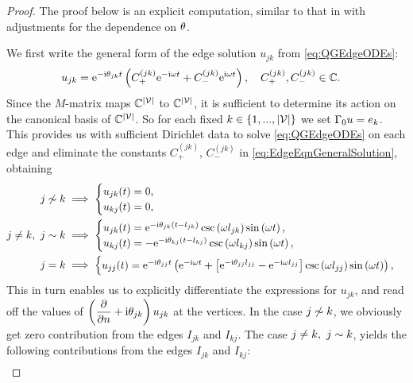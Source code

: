 \begin{proof}
	The proof below is an explicit computation, similar to that in \cite{ershova2014isospectrality} with adjustments for the dependence on $\theta$.
	
	We first write the general form of the edge solution $u_{jk}$ from \eqref{eq:QGEdgeODEs}:
	\begin{align} \label{eq:EdgeEqnGeneralSolution}
		u_{jk} &= \mathrm{e}^{-\mathrm{i}\theta_{jk}t}\left(  C_{+}^{(jk)}\mathrm{e}^{-\mathrm{i}\omega t} + C_{-}^{(jk)}\mathrm{e}^{\mathrm{i}\omega t}  \right),
		\quad C_{+}^{(jk)}, C_{-}^{(jk)}\in\mathbb{C}.
	\end{align}
	Since the $M$-matrix maps $\mathbb{C}^{\left\lvert \mathcal{V} \right\rvert}$ to $\mathbb{C}^{\left\lvert \mathcal{V} \right\rvert}$, it is sufficient to determine its action on the canonical basis of $\mathbb{C}^{\left\lvert \mathcal{V} \right\rvert}$.
	So for each fixed $k\in\left\{ 1,...,\left\lvert \mathcal{V} \right\rvert \right\}$ we set $\Gamma_0 u = e_k$.
	This provides us with sufficient Dirichlet data to solve \eqref{eq:QGEdgeODEs} on each edge and eliminate the constants $C_{+}^{(jk)}$, $C_{-}^{(jk)}$ in \eqref{eq:EdgeEqnGeneralSolution}, obtaining
	\begin{align*}
		j\not\sim k &\implies
		\begin{cases}
			u_{jk}(t) = 0, \\
			u_{kj}(t) = 0,
		\end{cases} \\
		j\neq k, \ j\sim k &\implies
		\begin{cases}
			u_{jk}(t) = \mathrm{e}^{-\mathrm{i}\theta_{jk}\left( t-l_{jk} \right)}\csc\left( \omega l_{jk} \right)\sin\left( \omega t \right), \\
			u_{kj}(t) = -\mathrm{e}^{-\mathrm{i}\theta_{kj}\left( t-l_{kj} \right)}\csc\left( \omega l_{kj} \right)\sin\left( \omega t \right),
		\end{cases} \\
		j = k &\implies 
		\begin{cases}
			u_{jj}(t) = \mathrm{e}^{-\mathrm{i}\theta_{jj}t} \left(  \mathrm{e}^{-\mathrm{i}\omega t} + \left[ \mathrm{e}^{-\mathrm{i}\theta_{jj}l_{jj}}-\mathrm{e}^{-\mathrm{i}\omega l_{jj}} \right]\csc\left( \omega l_{jj} \right)\sin\left( \omega t \right)   \right),
		\end{cases}
	\end{align*}
	This in turn enables us to explicitly differentiate the expressions for $u_{jk}$, and read off the values of $\left( \dfrac{\partial }{\partial n}+\mathrm{i}\theta_{jk} \right)u_{jk}$ at the vertices.
	In the case $j\not\sim k$, we obviously get zero contribution from the edges $I_{jk}$ and $I_{kj}$.
	The case $j\neq k, \ j\sim k$, yields the following contributions from the edges $I_{jk}$ and $I_{kj}$:
	\begin{align*}

\end{align*}
\end{proof}
